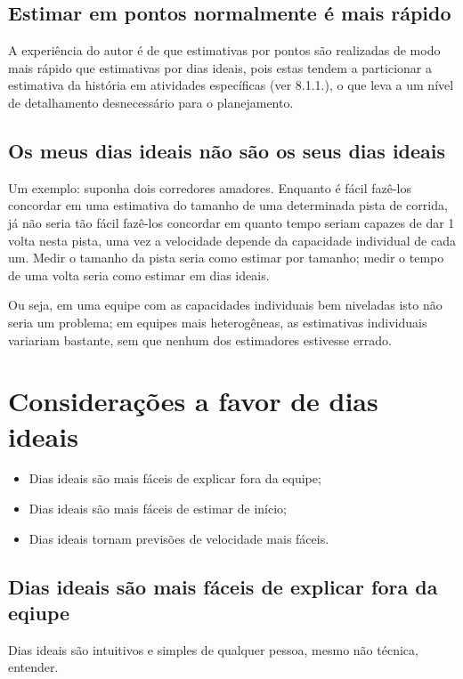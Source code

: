 \documentclass[a4paper,abntfigtabnum,noindentfirst]{abnt}
\begin{document}
\subsection{Estimar em pontos normalmente é mais rápido}

A experiência do autor é de que estimativas por pontos são realizadas de modo mais rápido que estimativas por dias ideais, pois estas tendem a particionar a estimativa da história em atividades específicas (ver 8.1.1.), o que leva a um nível de detalhamento desnecessário para o planejamento.


\subsection{Os meus dias ideais não são os seus dias ideais}

Um exemplo: suponha dois corredores amadores. Enquanto é fácil fazê-los concordar em uma estimativa do tamanho de uma determinada pista de corrida, já não seria tão fácil fazê-los concordar em quanto tempo seriam capazes de dar 1 volta nesta pista, uma vez a velocidade depende da capacidade individual de cada um. Medir o tamanho da pista seria como estimar por tamanho; medir o tempo de uma volta seria como estimar em dias ideais.

Ou seja, em uma equipe com as capacidades individuais bem niveladas isto não seria um problema; em equipes mais heterogêneas, as estimativas individuais variariam bastante, sem que nenhum dos estimadores estivesse errado.


\section{Considerações a favor de dias ideais}

\begin{itemize}
\item Dias ideais são mais fáceis de explicar fora da equipe;
\item Dias ideais são mais fáceis de estimar de início;
\item Dias ideais tornam previsões de velocidade mais fáceis.
\end{itemize}

\subsection{Dias ideais são mais fáceis de explicar fora da eqiupe}

Dias ideais são intuitivos e simples de qualquer pessoa, mesmo não técnica, entender.
\end{document}
